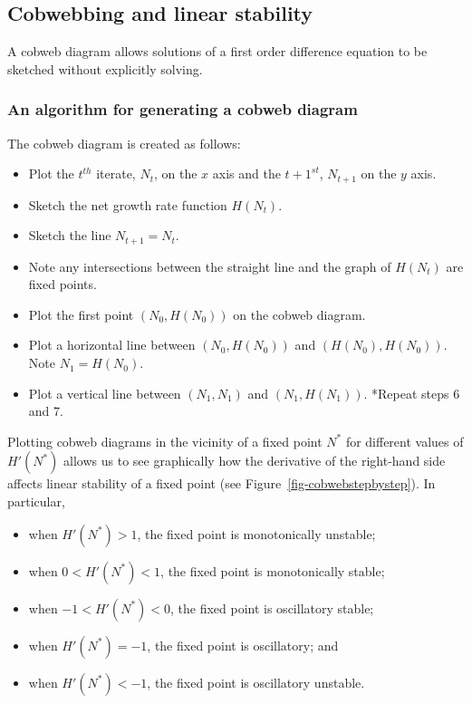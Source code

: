 \documentclass[
  letterpaper,
  DIV=11,
  numbers=noendperiod]{scrreprt}
\providecommand{\tightlist}{%
  \setlength{\itemsep}{0pt}\setlength{\parskip}{0pt}}
\begin{document}
\subsection{Cobwebbing and linear
stability}\label{cobwebbing-and-linear-stability}

A cobweb diagram allows solutions of a first order difference equation
to be sketched without explicitly solving.

\subsubsection{An algorithm for generating a cobweb
diagram}\label{an-algorithm-for-generating-a-cobweb-diagram}

The cobweb diagram is created as follows:

\begin{itemize}
\tightlist
\item
  Plot the \(t^{th}\) iterate, \(N_t\), on the \(x\) axis and the
  \(t+1^{st}\), \(N_{t+1}\) on the \(y\) axis.
\item
  Sketch the net growth rate function \(H(N_t)\).
\item
  Sketch the line \(N_{t+1}=N_t\).
\item
  Note any intersections between the straight line and the graph of
  \(H(N_t)\) are fixed points.
\item
  Plot the first point \((N_0, H(N_0))\) on the cobweb diagram.
\item
  Plot a horizontal line between \((N_0, H(N_0))\) and
  \((H(N_0),H(N_0))\). Note \(N_1=H(N_0)\).
\item
  Plot a vertical line between \((N_1,N_1)\) and \((N_1,H(N_1))\).
  *Repeat steps 6 and 7.
\end{itemize}

Plotting cobweb diagrams in the vicinity of a fixed point \(N^*\) for
different values of \(H'(N^*)\) allows us to see graphically how the
derivative of the right-hand side affects linear stability of a fixed
point (see Figure~\ref{fig-cobwebstepbystep}). In particular,

\begin{itemize}
\tightlist
\item
  when \(H'(N^*)>1\), the fixed point is monotonically unstable;
\item
  when \(0<H'(N^*)<1\), the fixed point is monotonically stable;
\item
  when \(-1<H'(N^*)<0\), the fixed point is oscillatory stable;
\item
  when \(H'(N^*)=-1\), the fixed point is oscillatory; and
\item
  when \(H'(N^*)<-1\), the fixed point is oscillatory unstable.
\end{itemize}
\end{document}

